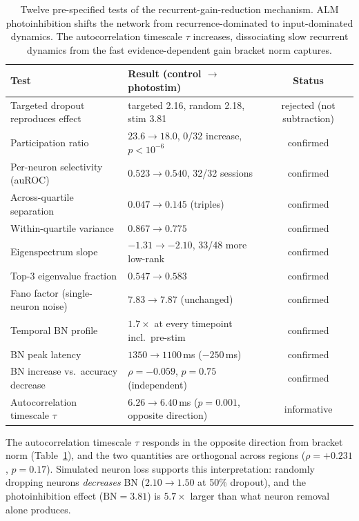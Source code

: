 \documentclass[9pt,lineno]{elife}
\begin{document}
\begin{table}[t]
\centering
\caption{Twelve pre-specified tests of the recurrent-gain-reduction mechanism. ALM photoinhibition shifts the network from recurrence-dominated to input-dominated dynamics. The autocorrelation timescale $\tau$ increases, dissociating slow recurrent dynamics from the fast evidence-dependent gain bracket norm captures.}
\label{tab:mechanism}
\small
\begin{tabular}{llc}
\toprule
Test & Result (control $\to$ photostim) & Status \\
\midrule
Targeted dropout reproduces effect & targeted 2.16, random 2.18, stim 3.81 & rejected (not subtraction) \\
Participation ratio & $23.6 \to 18.0$, 0/32 increase, $p<10^{-6}$ & confirmed \\
Per-neuron selectivity (auROC) & $0.523 \to 0.540$, 32/32 sessions & confirmed \\
Across-quartile separation & $0.047 \to 0.145$ (triples) & confirmed \\
Within-quartile variance & $0.867 \to 0.775$ & confirmed \\
Eigenspectrum slope & $-1.31 \to -2.10$, 33/48 more low-rank & confirmed \\
Top-3 eigenvalue fraction & $0.547 \to 0.583$ & confirmed \\
Fano factor (single-neuron noise) & $7.83 \to 7.87$ (unchanged) & confirmed \\
Temporal BN profile & $1.7\times$ at every timepoint incl.\ pre-stim & confirmed \\
BN peak latency & $1350 \to 1100$\,ms ($-250$\,ms) & confirmed \\
BN increase vs.\ accuracy decrease & $\rho = -0.059$, $p = 0.75$ (independent) & confirmed \\
Autocorrelation timescale $\tau$ & $6.26 \to 6.40$\,ms ($p = 0.001$, opposite direction) & informative \\
\bottomrule
\end{tabular}
\end{table}

The autocorrelation timescale $\tau$ responds in the opposite direction from bracket norm (Table~\ref{tab:mechanism}), and the two quantities are orthogonal across regions ($\rho = +0.231$, $p = 0.17$). Simulated neuron loss supports this interpretation: randomly dropping neurons \emph{decreases} BN ($2.10 \to 1.50$ at 50\% dropout), and the photoinhibition effect ($\text{BN} = 3.81$) is $5.7\times$ larger than what neuron removal alone produces.
\end{document}
